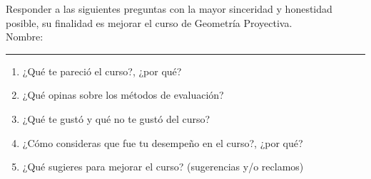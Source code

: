 \documentclass[12pt]{report}
\numberwithin{section}{chapter}
\begin{document}
Responder a las siguientes preguntas con la mayor sinceridad y honestidad posible, su finalidad es mejorar el curso de Geometría Proyectiva.\\

Nombre: \rule{16cm}{0.1mm}

\begin{enumerate}
\item ¿Qué te pareció el curso?, ¿por qué?
\vspace{3cm}
\item ¿Qué opinas sobre los métodos de evaluación?
\vspace{3cm}
\item ¿Qué te gustó y qué no te gustó del curso?
\vspace{3cm}
\item ¿Cómo consideras que fue tu desempeño en el curso?, ¿por qué?
\vspace{3cm}
\item ¿Qué sugieres para mejorar el curso? (sugerencias y/o reclamos)
\end{enumerate}
\end{document}

